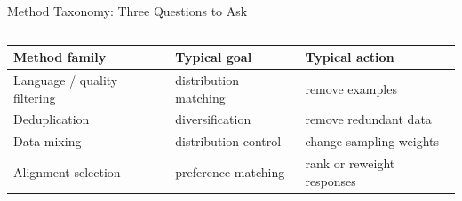 \documentclass[aspectratio=169]{beamer}
\begin{document}
\begin{frame}{Method Taxonomy: Three Questions to Ask}
\begin{columns}[T,totalwidth=\textwidth]
\end{columns}

\vspace{0.8em}

\begin{center}
\begin{tabular}{lll}
\toprule
\textbf{Method family} & \textbf{Typical goal} & \textbf{Typical action} \\
\midrule
Language / quality filtering & distribution matching & remove examples \\
Deduplication & diversification & remove redundant data \\
Data mixing & distribution control & change sampling weights \\
Alignment selection & preference matching & rank or reweight responses \\
\bottomrule
\end{tabular}
\end{center}

\end{frame}
\end{document}
